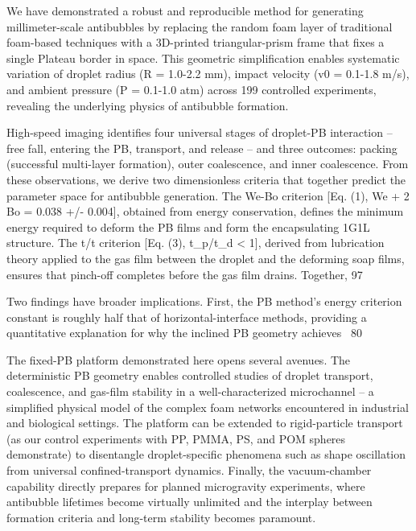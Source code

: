We have demonstrated a robust and reproducible method for generating millimeter-scale antibubbles by replacing the random foam layer of traditional foam-based techniques with a 3D-printed triangular-prism frame that fixes a single Plateau border in space. This geometric simplification enables systematic variation of droplet radius (R = 1.0-2.2 mm), impact velocity (v0 = 0.1-1.8 m/s), and ambient pressure (P = 0.1-1.0 atm) across 199 controlled experiments, revealing the underlying physics of antibubble formation.

High-speed imaging identifies four universal stages of droplet-PB interaction -- free fall, entering the PB, transport, and release -- and three outcomes: packing (successful multi-layer formation), outer coalescence, and inner coalescence. From these observations, we derive two dimensionless criteria that together predict the parameter space for antibubble generation. The We-Bo criterion [Eq. (1), We + 2 Bo = 0.038 +/- 0.004], obtained from energy conservation, defines the minimum energy required to deform the PB films and form the encapsulating 1G1L structure. The t/t criterion [Eq. (3), t_p/t_d < 1], derived from lubrication theory applied to the gas film between the droplet and the deforming soap films, ensures that pinch-off completes before the gas film drains. Together, 97%

Two findings have broader implications. First, the PB method's energy criterion constant is roughly half that of horizontal-interface methods, providing a quantitative explanation for why the inclined PB geometry achieves ~80%

The fixed-PB platform demonstrated here opens several avenues. The deterministic PB geometry enables controlled studies of droplet transport, coalescence, and gas-film stability in a well-characterized microchannel -- a simplified physical model of the complex foam networks encountered in industrial and biological settings. The platform can be extended to rigid-particle transport (as our control experiments with PP, PMMA, PS, and POM spheres demonstrate) to disentangle droplet-specific phenomena such as shape oscillation from universal confined-transport dynamics. Finally, the vacuum-chamber capability directly prepares for planned microgravity experiments, where antibubble lifetimes become virtually unlimited and the interplay between formation criteria and long-term stability becomes paramount.